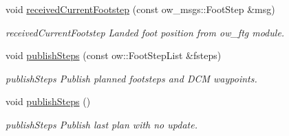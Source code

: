 \begin{DoxyCompactItemize}
void \hyperlink{classow__planner_1_1WalkingPlanner_a622132830a0f0311506739a17e4f0f38}{received\+Current\+Footstep} (const ow\+\_\+msgs\+::\+Foot\+Step \&msg)
\begin{DoxyCompactList}\small\item\em received\+Current\+Footstep Landed foot position from ow\+\_\+ftg module. \end{DoxyCompactList}\item 
void \hyperlink{classow__planner_1_1WalkingPlanner_ad029f7b73af02397dcc6de9ce3f9c845}{publish\+Steps} (const ow\+::\+Foot\+Step\+List \&fsteps)
\begin{DoxyCompactList}\small\item\em publish\+Steps Publish planned footsteps and D\+CM waypoints. \end{DoxyCompactList}\item 
void \hyperlink{classow__planner_1_1WalkingPlanner_a7a6c68eda1f693e864d0939ddd928c8c}{publish\+Steps} ()\hypertarget{classow__planner_1_1WalkingPlanner_a7a6c68eda1f693e864d0939ddd928c8c}{}\label{classow__planner_1_1WalkingPlanner_a7a6c68eda1f693e864d0939ddd928c8c}

\begin{DoxyCompactList}\small\item\em publish\+Steps Publish last plan with no update. \end{DoxyCompactList}\end{DoxyCompactItemize}
